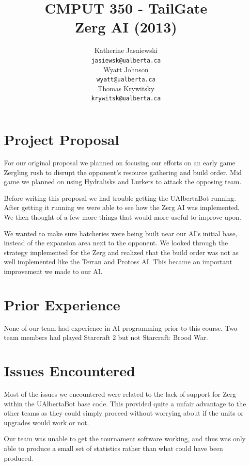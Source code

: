 \documentclass{article}
\title{CMPUT 350 - TailGate\\
Zerg AI (2013)}
\author{
		Katherine Jasniewski\\
		\texttt{jasiewsk@ualberta.ca} \\
	\AND
		Wyatt Johnson\\
		\texttt{wyatt@ualberta.ca} \\
	\AND
		Thomas Krywitsky\\
		\texttt{krywitsk@ualberta.ca} \\
}
\begin{document}
\maketitle


\section{Project Proposal}

For our original proposal we planned on focusing our efforts on an early game Zergling rush to disrupt the opponent's resource gathering and build order. Mid game we planned on using Hydralisks and Lurkers to attack the opposing team.

Before writing this proposal we had trouble getting the UAlbertaBot running. After getting it running we were able to see how the Zerg AI was implemented. We then thought of a few more things that would more useful to improve upon.

We wanted to make sure hatcheries were being built near our AI’s initial base, instead of the expansion area next to the opponent. We looked through the strategy implemented for the Zerg and realized that the build order was not as well implemented like the Terran and Protoss AI. This became an important improvement we made to our AI.

\section{Prior Experience}

None of our team had experience in AI programming prior to this course. Two team members had played Starcraft 2 but not Starcraft: Brood War.

\section{Issues Encountered}

Most of the issues we encountered were related to the lack of support for Zerg within the UAlbertaBot base code. This provided quite a unfair advantage to the other teams as they could simply proceed without worrying about if the units or upgrades would work or not.

Our team was unable to get the tournament software working, and thus was only able to produce a small set of statistics rather than what could have been produced.
\end{document}
